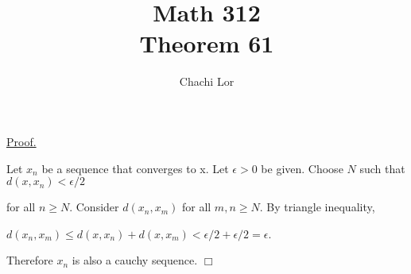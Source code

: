 \documentclass[a4paper]{article}
\title{Math 312\\Theorem 61}
\author{Chachi Lor}
\date{}
\begin{document}
\maketitle
\underline{Proof.}

Let $x_n$ be a sequence that converges to x. Let $\epsilon > 0$ be given. Choose $N$ such that $d(x, x_n) < \epsilon/2$

for all $n \geq N$. Consider $d(x_n, x_m)$ for all $m, n \geq N$. By triangle inequality,

\begin{center}
$d(x_n, x_m) \leq d(x, x_n) + d(x, x_m) < \epsilon/2 + \epsilon/2 = \epsilon$.
\end{center}

Therefore $x_n$ is also a cauchy sequence. $\Box$
\end{document}
